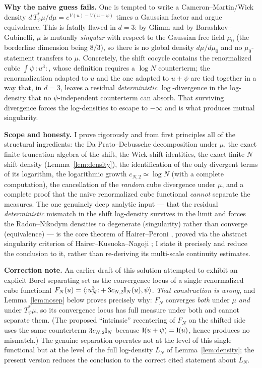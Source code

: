 \medskip
\noindent\textbf{Why the naive guess fails.} One is tempted to write a
Cameron--Martin/Wick density $d\,T_\psi^*\mu/d\mu=e^{V(u)-V(u-\psi)}$ times a Gaussian
factor and argue equivalence. This is fatally flawed in $d=3$: by Glimm and by
Barashkov--Gubinelli, $\mu$ is mutually \emph{singular} with respect to the Gaussian
free field $\mu_0$ (the borderline dimension being $8/3$), so there is no global
density $d\mu/d\mu_0$ and no $\mu_0$-statement transfers to $\mu$. Concretely, the
shift cocycle contains the renormalized cubic $\int\psi\,{:}u^3{:}$, whose definition
requires a $\log N$ counterterm; the renormalization adapted to $u$ and the one adapted
to $u+\psi$ are tied together in a way that, in $d=3$, leaves a residual
\emph{deterministic} $\log$-divergence in the log-density that no $\psi$-independent
counterterm can absorb. That surviving divergence forces the log-densities to escape to
$-\infty$ and is what produces mutual singularity.

\medskip
\noindent\textbf{Scope and honesty.} I prove rigorously and from first principles all
of the structural ingredients: the Da Prato--Debussche decomposition under $\mu$, the
exact finite-truncation algebra of the shift, the Wick-shift identities, the exact
finite-$N$ shift density (Lemma~\ref{lem:density}), the identification of the only
divergent terms of its logarithm, the logarithmic growth $c_{N,2}\simeq\log N$ (with a
complete computation), the cancellation of the \emph{random} cube divergence under
$\mu$, and a complete proof that the naive renormalized cube functional \emph{cannot}
separate the measures. The one genuinely deep analytic input --- that the residual
\emph{deterministic} mismatch in the shift log-density survives in the limit and forces
the Radon--Nikodym densities to degenerate (singularity) rather than converge
(equivalence) --- is the core theorem of Hairer--Peroni \cite{HP25}, proved via the
abstract singularity criterion of Hairer--Kusuoka--Nagoji \cite{HKN24}; I state it
precisely and reduce the conclusion to it, rather than re-deriving its multi-scale
continuity estimates.

\medskip
\noindent\textbf{Correction note.} An earlier draft of this solution attempted to
exhibit an explicit Borel separating set as the convergence locus of a single
renormalized cube functional $F_N(u)=\langle{:}u_N^3{:}+3c_{N,2}\mathbf{l}_N(u),\psi\rangle$.
\emph{That construction is wrong}, and Lemma~\ref{lem:nosep} below proves precisely why:
$F_N$ converges \emph{both} under $\mu$ \emph{and} under $T_\psi^*\mu$, so its
convergence locus has full measure under both and cannot separate them. (The proposed
``intrinsic'' recentering of $F_N$ on the shifted side uses the same counterterm
$3c_{N,2}\mathbf{l}_N$ because $\mathbf{l}(u+\psi)=\mathbf{l}(u)$, hence produces no
mismatch.) The genuine separation operates not at the level of this single functional
but at the level of the full log-density $L_N$ of Lemma~\ref{lem:density}; the present
version reduces the conclusion to the correct cited statement about $L_N$.

